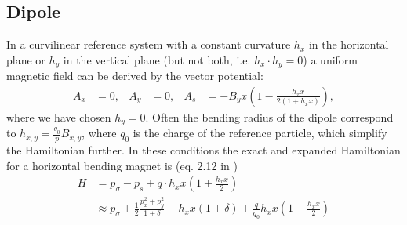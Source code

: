 \documentclass[english]{article}
\begin{document}
\subsection{Dipole}
In a curvilinear reference system with a constant curvature $h_x$ in the
horizontal plane or $h_y$ in the vertical plane (but not both, i.e. $h_x \cdot h_y=0$)
a uniform magnetic field can be derived by the vector potential:
\begin{align}
  A_x & = 0, & A_y & = 0, & A_s & = 
  - B_y x\left(1-\frac{h_xx}{2(1+h_xx)}\right),
\end{align}
where we have chosen $h_y=0$. Often the bending radius of the dipole correspond to 
$h_{x,y}=\frac{q_0}{p} B_{x,y}$, where $q_0$ is the charge of the reference particle, 
which simplify the Hamiltonian further. In these conditions the exact and
expanded Hamiltonian for a horizontal bending magnet is (eq. 2.12 in
\cite{barber87})
\begin{align}
  H &= p_\sigma - p_s + q\cdot h_xx \left(1+\frac{h_xx}{2}\right) \\
    &\approx p_\sigma + \frac{1}{2}\frac{p_x^2+p_y^2}{1+\delta}
  - h_xx(1+\delta) + \frac{q}{q_0} h_xx \left(1+\frac{h_xx}{2}\right)
\end{align}
\end{document}
